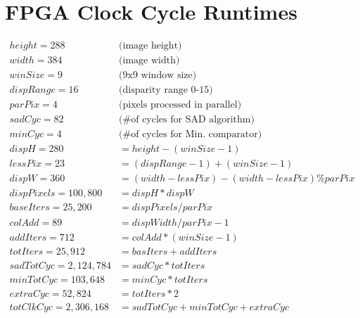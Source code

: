\section{FPGA Clock Cycle Runtimes}

\begin{subequations}
\begin{align} 	\label{eq:clockCycles}
	height = 288 	\qquad & \text{(image height)}\\
	width = 384 	\qquad & \text{(image width)}\\
	winSize = 9	 	\qquad & \text{(9x9 window size)}\\
	dispRange = 16 	\qquad & \text{(disparity range 0-15)}\\
	parPix = 4 		\qquad & \text{(pixels processed in parallel)}\\
	sadCyc = 82		\qquad & \text{(\# of cycles for SAD algorithm)}\\
	minCyc = 4		\qquad & \text{(\# of cycles for Min. comparator)}\\
	dispH = 280 &= height - (winSize - 1) \\
	lessPix = 23 &= (dispRange-1) + (winSize-1) \\
	dispW = 360 &= (width-lessPix) - (width-lessPix) \% parPix \\
	dispPixels = 100,800 &= dispH * dispW \\
	baseIters = 25,200 &= dispPixels / parPix \\
	colAdd = 89 &= dispWidth / parPix - 1 \\
	addIters = 712 &= colAdd * (winSize-1) \\
	totIters = 25,912 &= basIters + addIters \\
	sadTotCyc = 2,124,784 &= sadCyc * totIters \\
	minTotCyc = 103,648 &= minCyc * totIters \\
	extraCyc = 52,824 &= totIters * 2 \\
	totClkCyc = 2,306,168 &= sadTotCyc + minTotCyc + extraCyc
\end{align}
\end{subequations}


